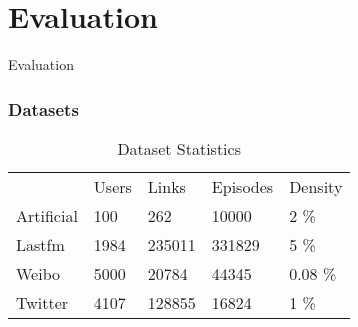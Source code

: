 \section{Evaluation}

\begin{frame}
        \centering
        \huge Evaluation
\end{frame}

\begin{frame}
	\frametitle{Datasets}
	\begin{table}[htb]
		\centering
		\begin{tabular}{lllll}
						& Users 	& Links 		& Episodes		& Density\\
			Artificial	& \num{100}	& \num{262}		& \num{10000} 	& 2 \% \\
			Lastfm		& \num{1984}& \num{235011}	& \num{331829}	& 5 \% \\
			Weibo		& \num{5000}& \num{20784}	& \num{44345}	& 0.08 \% \\
			Twitter		& \num{4107}& \num{128855}	& \num{16824}	& 1 \%
		\end{tabular}
		\caption{Dataset Statistics}
	\end{table}
\end{frame}


